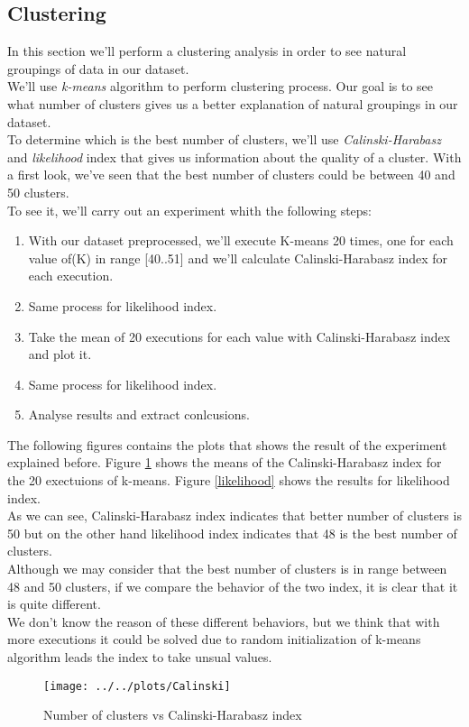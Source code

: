 \documentclass[a4paper]{article} %
\begin{document}
\subsection{Clustering}
In this section we'll perform a clustering analysis in order to see natural groupings of data in our dataset.  \\
We'll use \textit{k-means} algorithm to perform clustering process. Our goal is to see what number of clusters gives us a better explanation of natural groupings in our dataset. \\
To determine which is the best number of clusters, we'll use \textit{Calinski-Harabasz} and  \textit{likelihood} index that gives us information about the quality of a cluster.
With a first look, we've seen that the best number of clusters could be between 40 and 50 clusters. \\
To see it, we'll carry out an experiment whith the following steps:
\begin{enumerate}
	\item With our dataset preprocessed, we'll execute K-means 20 times, one for each value of(K) in range [40..51] and we'll calculate Calinski-Harabasz index for each execution.
	\item Same process for likelihood index.
	\item Take the mean of 20 executions for each value with Calinski-Harabasz index and plot it.
	\item Same process for likelihood index.
	\item Analyse results and extract conlcusions.
\end{enumerate}



The following figures contains the plots that shows the result of the experiment explained before. Figure \ref{calinski} shows the means of the Calinski-Harabasz index for the 20 exectuions of k-means. Figure \ref{likelihood} shows the results for likelihood index. \\

As we can see, Calinski-Harabasz index indicates that better number of clusters is 50 but on the other hand likelihood index indicates that 48 is the best number of clusters. \\
Although we may consider that the best number of clusters is in range between 48 and 50 clusters, if we compare the behavior of the two index, it is clear that it is quite different. \\
We don't know the reason of these different behaviors, but we think that with more executions it could be solved due to random initialization of k-means algorithm leads the index to take unsual values.
\begin{figure}
	\label{calinski}
\texttt{[image: ../../plots/Calinski]}
	\caption{Number of clusters vs Calinski-Harabasz index}
\end{figure}
\end{document}
